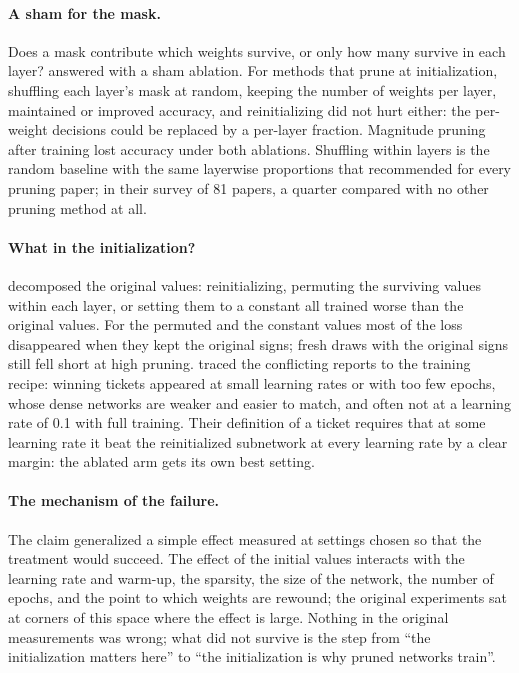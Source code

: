 \begin{refsection}
\paragraph{A sham for the mask.} Does a mask contribute which weights survive, or only how many survive in each layer? \Textcite{FrankleEtAl2021} answered with a sham ablation. For methods that prune at initialization, shuffling each layer's mask at random, keeping the number of weights per layer, maintained or improved accuracy, and reinitializing did not hurt either: the per-weight decisions could be replaced by a per-layer fraction. Magnitude pruning after training lost accuracy under both ablations. Shuffling within layers is the random baseline with the same layerwise proportions that \textcite{BlalockEtAl2020} recommended for every pruning paper; in their survey of 81 papers, a quarter compared with no other pruning method at all.

\paragraph{What in the initialization?} \Textcite{ZhouEtAl2019} decomposed the original values: reinitializing, permuting the surviving values within each layer, or setting them to a constant all trained worse than the original values. For the permuted and the constant values most of the loss disappeared when they kept the original signs; fresh draws with the original signs still fell short at high pruning. \Textcite{MaEtAl2021} traced the conflicting reports to the training recipe: winning tickets appeared at small learning rates or with too few epochs, whose dense networks are weaker and easier to match, and often not at a learning rate of 0.1 with full training. Their definition of a ticket requires that at some learning rate it beat the reinitialized subnetwork at every learning rate by a clear margin: the ablated arm gets its own best setting.

\paragraph{The mechanism of the failure.} The claim generalized a simple effect measured at settings chosen so that the treatment would succeed. The effect of the initial values interacts with the learning rate and warm-up, the sparsity, the size of the network, the number of epochs, and the point to which weights are rewound; the original experiments sat at corners of this space where the effect is large. Nothing in the original measurements was wrong; what did not survive is the step from \enquote{the initialization matters here} to \enquote{the initialization is why pruned networks train}.


\end{refsection}
